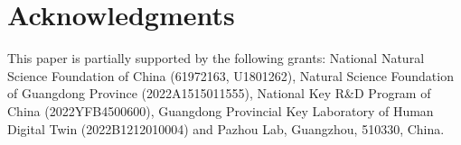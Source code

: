 \documentclass[letterpaper]{article} \usepackage{aaai23}  \usepackage{times}  \usepackage{helvet}  \usepackage{courier}  \usepackage[hyphens]{url}  \usepackage{graphicx} \urlstyle{rm} \def\UrlFont{\rm}  \usepackage{natbib}  \usepackage{caption} \frenchspacing  \setlength{\pdfpagewidth}{8.5in}  \setlength{\pdfpageheight}{11in}  \usepackage{algorithm}
\begin{document}
\section*{Acknowledgments}
This paper is partially supported by the following grants: National Natural Science Foundation of China (61972163, U1801262), Natural Science Foundation of Guangdong Province (2022A1515011555), National Key R\&D Program of China (2022YFB4500600), Guangdong Provincial Key Laboratory of Human Digital Twin (2022B1212010004) and Pazhou Lab, Guangzhou, 510330, China. 


\end{document}
